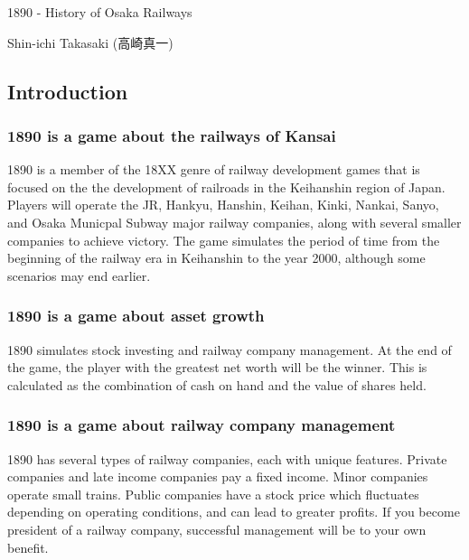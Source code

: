 \documentclass{article}
\makeatletter
\renewcommand\tableofcontents{%
    \@starttoc{toc}%
}
\makeatother
\begin{document}
\begin{CJK}{UTF8}{min}

\begin{titlepage}
\centering

{\Huge 1890 - History of Osaka Railways}

\vspace{1cm}

{\large Shin-ichi Takasaki (高崎真一)}

\vspace{1cm}

\begin{multicols}{2}
\tableofcontents
\end{multicols}
\end{titlepage}

\begin{multicols}{2}
\section*{Introduction}
\subsubsection*{1890 is a game about the railways of Kansai}
1890 is a member of the 18XX genre of railway development games that
is focused on the the development of railroads in the Keihanshin
region of Japan. Players will operate the JR, Hankyu, Hanshin, Keihan,
Kinki, Nankai, Sanyo, and Osaka Municpal Subway major railway
companies, along with several smaller companies to achieve
victory. The game simulates the period of time from the beginning of
the railway era in Keihanshin to the year 2000, although some
scenarios may end earlier.

\subsubsection*{1890 is a game about asset growth}
1890 simulates stock investing and railway company management. At the end
of the game, the player with the greatest net worth will be the
winner. This is calculated as the combination of cash on hand and
the value of shares held.

\subsubsection*{1890 is a game about railway company management}
1890 has several types of railway companies, each with unique
features. Private companies and late income companies pay a fixed
income. Minor companies operate small trains. Public companies have a
stock price which fluctuates depending on operating conditions, and
can lead to greater profits. If you become president of a railway
company, successful management will be to your own benefit.


\end{multicols}
\end{CJK}
\end{document}
